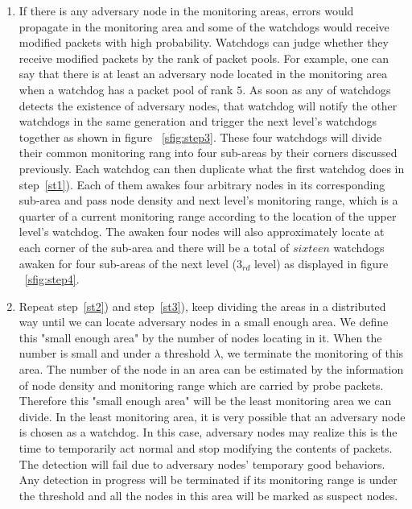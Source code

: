 \documentclass[conference]{IEEEtran}
\begin{document}
\begin{enumerate}
\item \label{st3}If there is any adversary node in the monitoring areas, errors would propagate in the monitoring area and some of the watchdogs would receive modified packets with high probability. Watchdogs can judge whether they receive modified packets by the rank of packet pools. For example, one can say that there is at least an adversary node located in the monitoring area when a watchdog has a packet pool of rank $5$. As soon as any of watchdogs detects the existence of adversary nodes, that watchdog will notify the other watchdogs in the same generation and trigger the next level's watchdogs together as shown in figure ~\ref{sfig:step3}. These four watchdogs will divide their common monitoring rang into four sub-areas by their corners discussed previously. Each watchdog can then duplicate what the first watchdog does in step~\ref{st1}).  Each of them awakes four arbitrary nodes in its corresponding sub-area and pass node density and next level's monitoring range, which is a quarter of a current monitoring range according to the location of the upper level's watchdog. The awaken four nodes will also approximately locate at each corner of the sub-area and there will be a total of $sixteen$ watchdogs awaken for four sub-areas of the next level ($3_{rd}$ level) as displayed in figure ~\ref{sfig:step4}. \\
\item Repeat step~\ref{st2}) and step~\ref{st3}), keep dividing the areas in a distributed way until we can locate adversary nodes in a small enough area. We define this "small enough area" by the number of nodes locating in it. When the number is small and under a threshold $\lambda$, we terminate the monitoring of this area. The number of the node in an area can be estimated by the information of node density and monitoring range which are carried by probe packets. Therefore this "small enough area" will be the least monitoring area we can divide. In the least monitoring area, it is very possible that an adversary node is chosen as a watchdog. In this case, adversary nodes may realize this is the time to temporarily act normal and stop modifying the contents of packets. The detection will fail due to adversary nodes' temporary good behaviors. Any detection in progress will be terminated if its monitoring range is under the threshold and all the nodes in this area will be marked as suspect nodes.\\

\end{enumerate}
\end{document}
